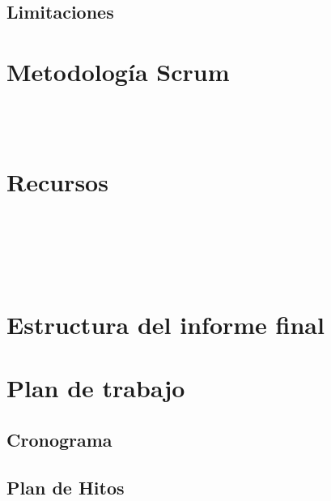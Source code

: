 
\subsection{Limitaciones}
\lipsum[5]

\section{Metodología Scrum}
\lipsum[10] \\
\lipsum[11] \\
\lipsum[12]

\clearpage

\section{Recursos}
\lipsum[20] \\
\lipsum[21] \\
\lipsum[22] \\
\lipsum[23] \\
\lipsum[24]

\clearpage

\section{Estructura del informe final}
\clearpage

\section{Plan de trabajo}
\subsection{Cronograma}

\subsection{Plan de Hitos}

\clearpage

